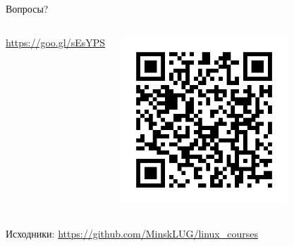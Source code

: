 \begin{frame}[fragile]{Вопросы?}
    \setcounter{tocdepth}{2}
    \tableofcontents

    \bigskip

    \hrulefill
    \begin{columns}
            \url{https://goo.gl/sEsYPS}
        \begin{center}
            \includegraphics[width=0.7\textwidth]{url-qr-2018}
        \end{center}
    \end{columns}

    Исходники: \url{https://github.com/MinskLUG/linux_courses}

\end{frame}

